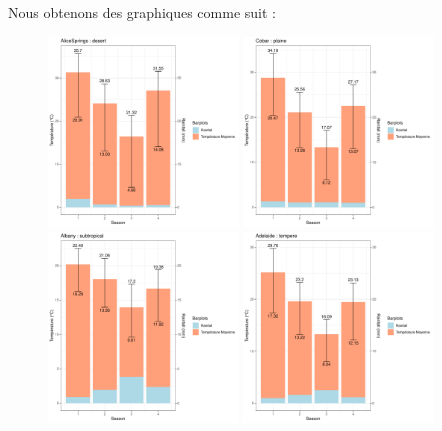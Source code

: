 \documentclass{article}
\begin{document}
Nous obtenons des graphiques comme suit : 

\begin{figure}[H]
    \centering
    \includegraphics[page=1,width=0.45\textwidth]{Images/Temp_and_Rainfalldesert.pdf}
    \includegraphics[page=1,width=0.45\textwidth]{Images/Temp_and_Rainfallplaine.pdf}
    \includegraphics[page=1,width=0.45\textwidth]{Images/Temp_and_Rainfallsubtropical.pdf}
    \includegraphics[page=1,width=0.45\textwidth]{Images/Temp_and_Rainfalltempere.pdf}

\end{figure}
\end{document}
